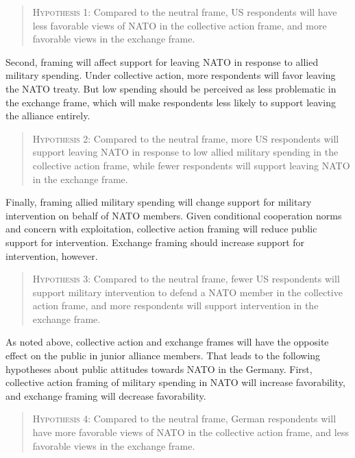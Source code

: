 \documentclass[12pt]{article}
\begin{document}
\begin{quote}
\textsc{Hypothesis 1}: Compared to the neutral frame, US respondents will have less favorable views of NATO in the collective action frame, and more favorable views in the exchange frame.  
\end{quote}

Second, framing will affect support for leaving NATO in response to allied military spending. 
Under collective action, more respondents will favor leaving the NATO treaty. 
But low spending should be perceived as less problematic in the exchange frame, which will make respondents less likely to support leaving the alliance entirely. 


\begin{quote}
\textsc{Hypothesis 2}: Compared to the neutral frame, more US respondents will support leaving NATO in response to low allied military spending in the collective action frame, while fewer respondents will support leaving NATO in the exchange frame.
\end{quote}


Finally, framing allied military spending will change support for military intervention on behalf of NATO members. 
Given conditional cooperation norms and concern with exploitation, collective action framing will reduce public support for intervention. 
Exchange framing should increase support for intervention, however. 


\begin{quote}
\textsc{Hypothesis 3}: Compared to the neutral frame, fewer US respondents will support military intervention to defend a NATO member in the collective action frame, and more respondents will support intervention in the exchange frame. 
\end{quote} 


As noted above, collective action and exchange frames will have the opposite effect on the public in junior alliance members. 
That leads to the following hypotheses about public attitudes towards NATO in the Germany.  
First, collective action framing of military spending in NATO will increase favorability, and exchange framing will decrease favorability. 


\begin{quote}
\textsc{Hypothesis 4}: Compared to the neutral frame, German respondents will have more favorable views of NATO in the collective action frame, and less favorable views in the exchange frame.  
\end{quote}
\end{document}
